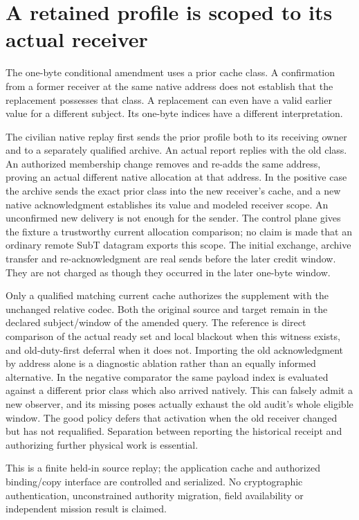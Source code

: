 \documentclass{article}
\begin{document}
\section*{A retained profile is scoped to its actual receiver}
The one-byte conditional amendment uses a prior cache class.
A confirmation from a former receiver at the same native address
does not establish that the replacement possesses that class.
A replacement can even have a valid earlier value for a
different subject. Its one-byte indices have a different
interpretation.

The civilian native replay first sends the prior profile both to
its receiving owner and to a separately qualified archive. An
actual report replies with the old class. An authorized membership
change removes and re-adds the same address, proving an actual
different native allocation at that address. In the positive
case the archive sends the exact prior class into the new
receiver's cache, and a new native acknowledgment establishes
its value and modeled receiver scope. An unconfirmed new delivery
is not enough for the sender. The control plane gives the fixture
a trustworthy current allocation comparison; no claim is made
that an ordinary remote SubT datagram exports this scope.
The initial exchange, archive transfer and re-acknowledgment
are real sends before the later credit window. They are not
charged as though they occurred in the later one-byte window.

Only a qualified matching current cache authorizes the supplement
with the unchanged relative codec. Both the original source and
target remain in the declared subject/window of the amended
query. The reference is direct comparison of the actual ready
set and local blackout when this witness exists, and old-duty-first
deferral when it does not. Importing the old acknowledgment by
address alone is a diagnostic ablation rather than an equally
informed alternative. In the negative comparator the same
payload index is evaluated against a different prior class
which also arrived natively. This can falsely admit a new
observer, and its missing poses actually exhaust the old audit's
whole eligible window. The good policy defers that activation
when the old receiver changed but has not requalified.
Separation between reporting the historical receipt and
authorizing further physical work is essential.

This is a finite held-in source replay; the application cache and
authorized binding/copy interface are controlled and serialized.
No cryptographic authentication, unconstrained authority migration,
field availability or independent mission result is claimed.
\end{document}
